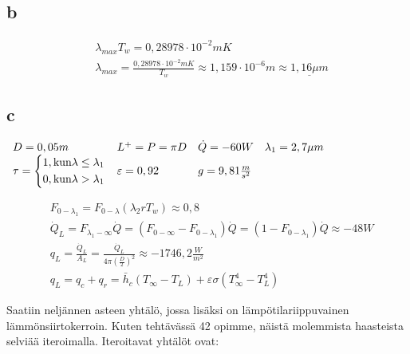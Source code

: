 \documentclass[12pt,a4paper,finnish]{article}
\begin{document}
\subsection{b}

\begin{align}
 &\lambda_{max} T_w = 0,28978\cdot10^{-2}mK\\
 &\lambda_{max} = \frac{0,28978\cdot10^{-2}mK}{T_w} \approx 1,159\cdot10^{-6}m \approx \underline{1,16\mu m}
\end{align}

\subsection{c}

\begin{math}
 \begin{array}{l l l l}
  D = 0,05 m & L^+ = P = \pi D & \dot{Q} = -60 W & \lambda_1 = 2,7\mu m \\
  \tau = 
    \left\{\begin{aligned}
	    &1, \text{kun} \lambda \leq \lambda_1 \\
	    &0, \text{kun} \lambda > \lambda_1
	   \end{aligned}\right. &
  \varepsilon = 0,92 & g = 9,81 \frac{m}{s^2} &
 \end{array}
\end{math}

\begin{align}
 &F_{0 - \lambda_1} = F_{0-\lambda}(\lambda_2r T_w) \approx 0,8 \\
 &\dot{Q}_L = F_{\lambda_1 - \infty}\dot{Q} = (F_{0 - \infty} - F_{0 - \lambda_1})\dot{Q} 
  = (1 - F_{0 - \lambda_1})\dot{Q} \approx -48 W \\
 &q_L = \frac{\dot{Q}_L}{A_L} = \frac{\dot{Q}_L}{4\pi\left(\frac{D}{2}\right)^2} \approx -1746,2 \frac{W}{m^2} \\
 &q_L = q_c + q_r = \bar{h}_c(T_{\infty} - T_L) + \varepsilon\sigma(T_{\infty}^4 - T_L^4)
\end{align}

Saatiin neljännen asteen yhtälö, jossa lisäksi on lämpötilariippuvainen lämmönsiirtokerroin. Kuten 
tehtävässä 42 opimme, näistä molemmista haasteista selviää iteroimalla. Iteroitavat yhtälöt ovat:
\end{document}

